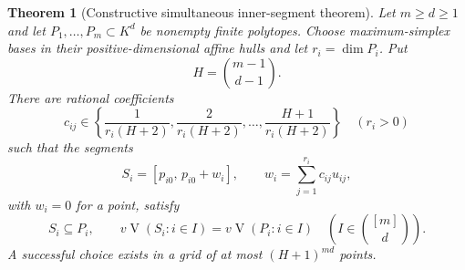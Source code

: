 \documentclass[11pt,a4paper]{article}
\numberwithin{equation}{section}
\newtheorem{theorem}{Theorem}[section]
\theoremstyle{plain}
\newcommand{\MV}{\operatorname{V}}
\begin{document}
\begin{theorem}[Constructive simultaneous inner-segment theorem]
\label{poly:mv:thm:segments}
Let $m\ge d\ge1$ and let $P_1,\ldots,P_m\subset K^d$ be nonempty finite
polytopes. Choose maximum-simplex bases in their positive-dimensional
affine hulls and let $r_i=\dim P_i$. Put
\[
 H=\binom{m-1}{d-1}.
\]
There are rational coefficients
\begin{equation}
\label{poly:mv:eq:coefficient-grid}
 c_{ij}\in\left\{\frac{1}{r_i(H+2)},\frac{2}{r_i(H+2)},
                       \ldots,\frac{H+1}{r_i(H+2)}\right\}
 \quad(r_i>0)
\end{equation}
such that the segments
\[
 S_i=[p_{i0},\,p_{i0}+w_i],\qquad
 w_i=\sum_{j=1}^{r_i}c_{ij}u_{ij},
\]
with $w_i=0$ for a point, satisfy
\begin{equation}
\label{poly:mv:eq:simultaneous-segments}
 S_i\subseteq P_i,
 \qquad
 v\MV(S_i:i\in I)=v\MV(P_i:i\in I)
       \quad\left(I\in\binom{[m]}d\right).
\end{equation}
A successful choice exists in a grid of at most $(H+1)^{md}$ points.
\end{theorem}
\end{document}
